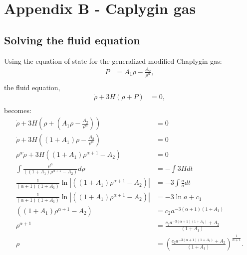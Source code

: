 \documentclass[a4paper, 11pt]{FSKH_623_Report}
\numberwithin{equation}{section}
\newcommand{\brac}[1]{\left(#1\right)}
\begin{document}
\section*{Appendix B - Caplygin gas}
\subsection*{Solving the fluid equation}
Using the equation of state for the generalized modified Chaplygin gas:
\begin{equation}\label{eq:B1}
\begin{split}
P &=A_{1}\rho-\frac{A_{2}}{\rho^{\alpha}},         \\
\end{split}
\end{equation}
the fluid equation,
\begin{equation}\label{eq:B2}
\begin{split}
\dot{\rho}+3H\brac{\rho+P} &= 0,        \\
\end{split}
\end{equation}
becomes:
\begin{equation}\label{eq:B3}
\begin{split}
\dot{\rho}+3H\brac{\rho+\brac{A_{1}\rho-\frac{A_{2}}{\rho^{\alpha}}}} &= 0 \\
\dot{\rho}+3H\brac{\brac{1+A_{1}}\rho-\frac{A_{2}}{\rho^{\alpha}}} &= 0 \\
\rho^{\alpha}\dot{\rho}+3H\brac{\brac{1+A_{1}}\rho^{\alpha+1}-A_{2}} &= 0 \\
\int\frac{\rho^{\alpha}}{\brac{\brac{1+A_{1}}\rho^{\alpha+1}-A_{2}}}d\rho&=-\int3Hdt\\
\frac{1}{\brac{\alpha+1}\brac{1+A_{1}}}\ln\left|\brac{\brac{1+A_{1}}\rho^{\alpha+1}-A_{2}}\right|&=-3\int\frac{\dot{a}}{a}dt\\
\frac{1}{\brac{\alpha+1}\brac{1+A_{1}}}\ln\left|\brac{\brac{1+A_{1}}\rho^{\alpha+1}-A_{2}}\right|&=-3\ln a+c_{1}\\
\brac{\brac{1+A_{1}}\rho^{\alpha+1}-A_{2}}&=c_{2}a^{-3\brac{\alpha+1}\brac{1+A_{1}}}\\
\rho^{\alpha+1}&=\frac{c_{2}a^{-3\brac{\alpha+1}\brac{1+A_{1}}}+A_{2}}{\brac{1+A_{1}}}\\
\rho&=\brac{\frac{c_{2}a^{-3\brac{\alpha+1}\brac{1+A_{1}}}+A_{2}}{\brac{1+A_{1}}}}^{\frac{1}{\alpha+1}}.\\
\end{split}
\end{equation}
\end{document}

